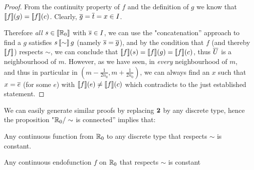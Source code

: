 \begin{proof}
From the continuity property of $f$ and the definition of
$g$ we know that $\llbracket f\rrbracket (g) = \llbracket f\rrbracket(c)$. Clearly, $\overline{g} =
\overline{t} = x \in I$. 

Therefore \emph{all} $s \in \llbracket \mathbb{R}_0\rrbracket$ with $\overline{s} \in I$, we can use the "concatenation'' approach to find a $g$
satisfies $s \, \llbracket \sim\rrbracket \,  g$ (namely $\overline{s} = \overline{g}$), and by the condition that $f$ (and
thereby $\llbracket f\rrbracket$) respects $\sim$, we can conclude that $\llbracket f\rrbracket
(s) = \llbracket f\rrbracket (g) = \llbracket f\rrbracket(c)$, thus $\overline{U}$ is a neighbourhood of $m$.
However, as we have seen, in \emph{every} neighbourhood of $m$, and thus in particular in $(m - \frac 1 {2n_0} , m+ \frac 1 {2n_0})$, we can always find an $x$ such that $x = \overline{e}$ (for some $e$) with $\llbracket f\rrbracket(e) \not= \llbracket f\rrbracket(c)$ which contradicts to the just established statement.
\end{proof}



We can easily generate similar proofs by replacing $\mathbf{2}$ by any discrete type, hence the proposition "$\mathbb{R}_0 / \sim$ is connected'' implies that:

\begin{corollary}\label{dis:con}
Any continuous function from $\mathbb{R}_0$ to any discrete type that respects $\sim$ is constant.
\end{corollary}



\begin{theorem}
Any continuous endofunction $f$ on $\mathbb{R}_0$ that respects $\sim$ is constant
\end{theorem}

